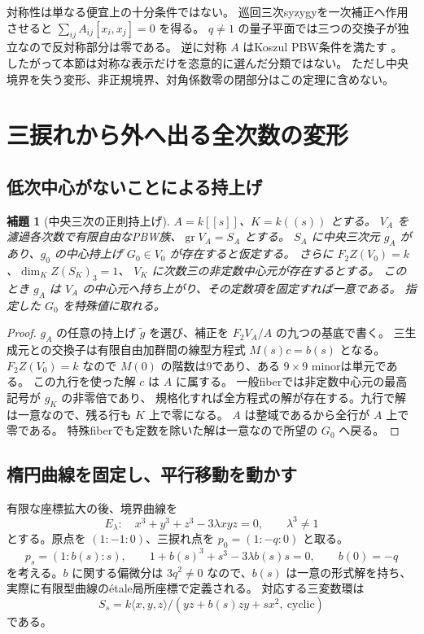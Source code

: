 \documentclass[11pt,a4paper]{ltjsarticle}
\newtheorem{lemma}[theorem]{補題}
\theoremstyle{definition}\newtheorem{definition}[theorem]{定義}
\theoremstyle{remark}\newtheorem{remark}[theorem]{注意}
\begin{document}
対称性は単なる便宜上の十分条件ではない。
巡回三次syzygyを一次補正へ作用させると
$\sum_{ij}A_{ij}[x_i,x_j]=0$ を得る。
$q\ne1$ の量子平面では三つの交換子が独立なので反対称部分は零である。
逆に対称 $A$ はKoszul PBW条件を満たす \cite{BG,EG}。
したがって本節は対称な表示だけを恣意的に選んだ分類ではない。
ただし中央境界を失う変形、非正規境界、対角係数零の閉部分はこの定理に含めない。

\section{三捩れから外へ出る全次数の変形}\label{sec:integrate}
\subsection{低次中心がないことによる持上げ}
\begin{lemma}[中央三次の正則持上げ]\label{lem:central-lift}
$A=k[[s]]$、$K=k((s))$ とする。
$V_A$ を濾過各次数で有限自由なPBW族、$\operatorname{gr}V_A=S_A$ とする。
$S_A$ に中央三次元 $g_A$ があり、$g_0$ の中心持上げ $G_0\in V_0$ が存在すると仮定する。
さらに $F_2Z(V_0)=k$、$\dim_K Z(S_K)_3=1$、
$V_K$ に次数三の非定数中心元が存在するとする。
このとき $g_A$ は $V_A$ の中心元へ持ち上がり、その定数項を固定すれば一意である。
指定した $G_0$ を特殊値に取れる。
\end{lemma}
\begin{proof}
$g_A$ の任意の持上げ $\widetilde g$ を選び、補正を
$F_2V_A/A$ の九つの基底で書く。
三生成元との交換子は有限自由加群間の線型方程式 $M(s)c=b(s)$ となる。
$F_2Z(V_0)=k$ なので $M(0)$ の階数は9であり、ある $9\times9$ minorは単元である。
この九行を使った解 $c$ は $A$ に属する。
一般fiberでは非定数中心元の最高記号が $g_K$ の非零倍であり、
規格化すれば全方程式の解が存在する。九行で解は一意なので、残る行も $K$ 上で零になる。
$A$ は整域であるから全行が $A$ 上で零である。
特殊fiberでも定数を除いた解は一意なので所望の $G_0$ へ戻る。
\end{proof}

\subsection{楕円曲線を固定し、平行移動を動かす}
有限な座標拡大の後、境界曲線を
\[
E_\lambda:\quad x^3+y^3+z^3-3\lambda xyz=0,\qquad \lambda^3\ne1
\]
とする。原点を $(1:-1:0)$、三捩れ点を $p_0=(1:-q:0)$ と取る。
\[
p_s=(1:b(s):s),\qquad 1+b(s)^3+s^3-3\lambda b(s)s=0,\qquad b(0)=-q
\]
を考える。$b$ に関する偏微分は $3q^2\ne0$ なので、$b(s)$ は一意の形式解を持ち、
実際に有限型曲線の\'{e}tale局所座標で定義される。
対応する三変数環は
\[
S_s=k\langle x,y,z\rangle/(yz+b(s)zy+sx^2,\ \mathrm{cyclic})
\]
である。
\end{document}
